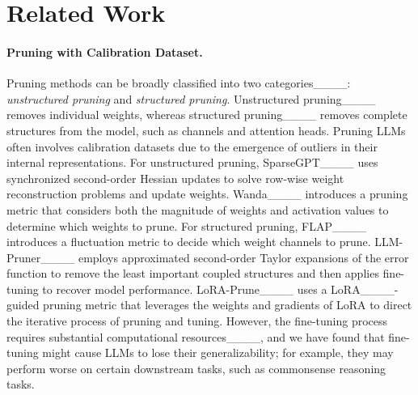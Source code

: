 \section{Related Work}
\vspace{-0.3cm}
\paragraph{Pruning with Calibration Dataset.} Pruning methods can be broadly classified into two categories____: \textit{unstructured pruning} and \textit{structured pruning}. Unstructured pruning____ removes individual weights, whereas structured pruning____ removes complete structures from the model, such as channels and attention heads. Pruning LLMs often involves calibration datasets due to the emergence of outliers in their internal representations. For unstructured pruning, SparseGPT____ uses synchronized second-order Hessian updates to solve row-wise weight reconstruction problems and update weights. Wanda____ introduces a pruning metric that considers both the magnitude of weights and activation values to determine which weights to prune. For structured pruning, FLAP____ introduces a fluctuation metric to decide which weight channels to prune. LLM-Pruner____ employs approximated second-order Taylor expansions of the error function to remove the least important coupled structures and then applies fine-tuning to recover model performance. LoRA-Prune____ uses a LoRA____-guided pruning metric that leverages the weights and gradients of LoRA to direct the iterative process of pruning and tuning. However, the fine-tuning process requires substantial computational resources____, and we have found that fine-tuning might cause LLMs to lose their generalizability; for example, they may perform worse on certain downstream tasks, such as commonsense reasoning tasks.
\vspace{-0.3cm}
